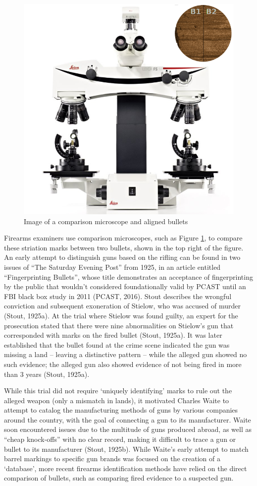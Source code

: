 \documentclass[print]{nuthesis}
\begin{document}
\begin{figure}

{\centering \includegraphics[width=0.5\linewidth]{images/microscope} 

}

\caption{Image of a comparison microscope and aligned bullets}\label{fig:microscope}
\end{figure}

Firearms examiners use comparison microscopes, such as Figure \ref{fig:microscope}, to compare these striation marks between two bullets, shown in the top right of the figure.
An early attempt to distinguish guns based on the rifling can be found in two issues of ``The Saturday Evening Post'' from 1925, in an article entitled ``Fingerprinting Bullets'', whose title demonstrates an acceptance of fingerprinting by the public that wouldn't  considered foundationally valid by PCAST  until an FBI black box study in 2011 (PCAST, 2016).
Stout describes the wrongful conviction and subsequent exoneration of Stielow, who was accused of murder (Stout, 1925a).
At the trial where Stielow was found guilty, an expert for the prosecution stated that there were nine abnormalities on Stielow's gun that corresponded with marks on the fired bullet (Stout, 1925a).
It was later established that the bullet found at the crime scene indicated the gun was missing a land -- leaving a distinctive pattern -- while the alleged gun showed no such evidence; the alleged gun also showed evidence of not being fired in more than 3 years (Stout, 1925a).

While this trial did not require `uniquely identifying' marks to rule out the alleged weapon (only a mismatch in lands), it motivated Charles Waite to attempt to catalog the manufacturing methods of guns by various companies around the country, with the goal of connecting a gun to its manufacturer.
Waite soon encountered issues due to the multitude of guns produced abroad, as well as ``cheap knock-offs'' with no clear record, making it difficult to trace a gun or bullet to its manufacturer (Stout, 1925b).
While Waite's early attempt to match barrel markings to specific gun brands was focused on the creation of a `database', more recent firearms identification methods have relied on the direct comparison of bullets, such as comparing fired evidence to a suspected gun.
\end{document}
